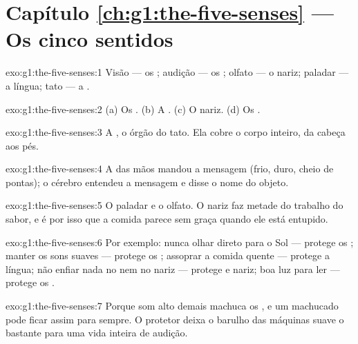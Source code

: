 \section*{Capítulo \ref{ch:g1:the-five-senses} --- Os cinco sentidos}

\begin{solution}{exo:g1:the-five-senses:1}
Visão --- os ; audição --- os ; olfato --- o nariz;
paladar --- a língua; tato --- a .
\end{solution}

\begin{solution}{exo:g1:the-five-senses:2}
(a) Os . (b) A . (c) O nariz. (d) Os .
\end{solution}

\begin{solution}{exo:g1:the-five-senses:3}
A , o órgão do tato. Ela cobre o corpo inteiro, da cabeça aos
pés.
\end{solution}

\begin{solution}{exo:g1:the-five-senses:4}
A  das mãos mandou a mensagem (frio, duro, cheio de pontas); o
cérebro entendeu a mensagem e disse o nome do objeto.
\end{solution}

\begin{solution}{exo:g1:the-five-senses:5}
O paladar e o olfato. O nariz faz metade do trabalho do sabor, e é
por isso que a comida parece sem graça quando ele está entupido.
\end{solution}

\begin{solution}{exo:g1:the-five-senses:6}
Por exemplo: nunca olhar direto para o Sol --- protege os ;
manter os sons suaves --- protege os ; assoprar a comida
quente --- protege a língua; não enfiar nada no  nem no nariz
--- protege  e nariz; boa luz para ler --- protege os .
\end{solution}

\begin{solution}{exo:g1:the-five-senses:7}
Porque som alto demais machuca os , e um  machucado
pode ficar assim para sempre. O protetor deixa o barulho das
máquinas suave o bastante para uma vida inteira de audição.
\end{solution}

